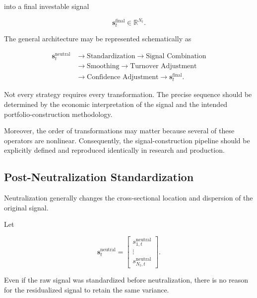 \documentclass[11pt,a4paper]{article}
\begin{document}
into a final investable signal

\begin{equation}
\boxed{
\mathbf{s}_t^{\mathrm{final}}
\in
\mathbb{R}^{N_t}.
}
\end{equation}

The general architecture may be represented schematically as

\begin{equation}
\boxed{
\begin{aligned}
\mathbf{s}_t^{\mathrm{neutral}}
&\rightarrow
\text{Standardization}
\rightarrow
\text{Signal Combination}
\\
&\rightarrow
\text{Smoothing}
\rightarrow
\text{Turnover Adjustment}
\\
&\rightarrow
\text{Confidence Adjustment}
\rightarrow
\mathbf{s}_t^{\mathrm{final}}.
\end{aligned}
}
\end{equation}

Not every strategy requires every transformation. The precise sequence should
be determined by the economic interpretation of the signal and the intended
portfolio-construction methodology.

Moreover, the order of transformations may matter because several of these
operators are nonlinear. Consequently, the signal-construction pipeline should
be explicitly defined and reproduced identically in research and production.


\subsection{Post-Neutralization Standardization}
\label{subsec:post_neutralization_standardization}

Neutralization generally changes the cross-sectional location and dispersion of
the original signal.

Let

\begin{equation}
\mathbf{s}_t^{\mathrm{neutral}}
=
\begin{bmatrix}
s_{1,t}^{\mathrm{neutral}}
\\
\vdots
\\
s_{N_t,t}^{\mathrm{neutral}}
\end{bmatrix}.
\end{equation}

Even if the raw signal was standardized before neutralization, there is no
reason for the residualized signal to retain the same variance.
\end{document}
